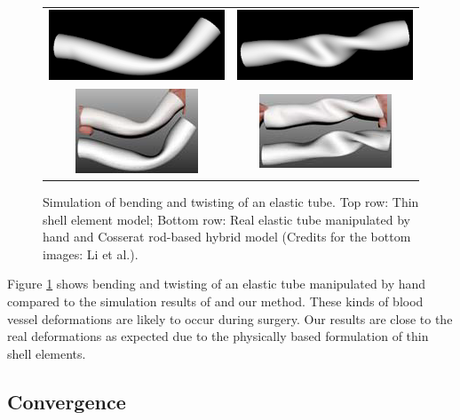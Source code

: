 \begin{figure}[tbh]
    \centering
    \begin{tabular}{cc}
     \includegraphics[width=0.4\columnwidth]{img/compare-bend.png}
      &
      \includegraphics[width=0.4\columnwidth]{img/compare-twist.png}
      \\
      \includegraphics[width=0.4\columnwidth]{img/compare-bend-other.png}
      &
      \includegraphics[width=0.4\columnwidth]{img/compare-twist-other.png}
    \end{tabular}
    \caption{Simulation of bending and twisting of an elastic tube. Top row: Thin shell element model; Bottom row: Real elastic tube manipulated by hand and Cosserat rod-based hybrid model \cite{Li2009} (Credits for the bottom images: Li et al.).}
    \label{fig-deformations}
\end{figure}

Figure \ref{fig-deformations} shows bending and twisting of an elastic tube manipulated by hand compared to the simulation results of \cite{Li2009} and our method. These kinds of blood vessel deformations are likely to occur during surgery. Our results are close to the real deformations as expected due to the physically based formulation of thin shell elements.

\subsection{Convergence}


